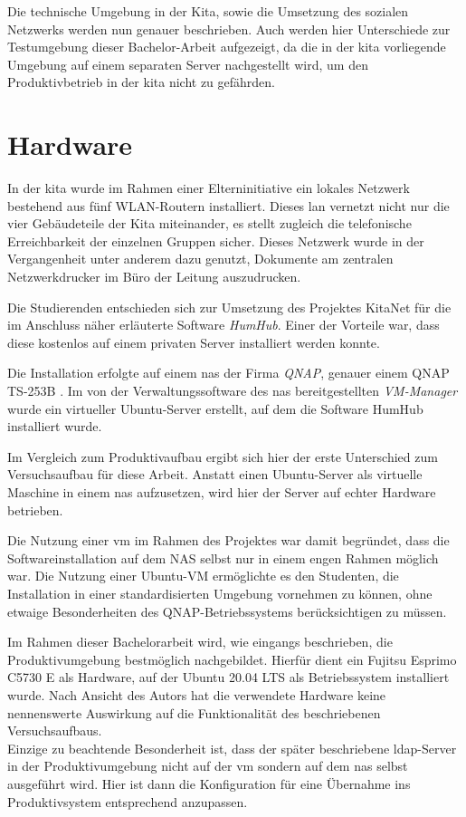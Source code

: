 Die technische Umgebung in der Kita, sowie die Umsetzung des sozialen Netzwerks werden nun genauer beschrieben. Auch werden hier Unterschiede zur Testumgebung dieser Bachelor-Arbeit aufgezeigt, da die in der \ac{kita} vorliegende Umgebung auf einem separaten Server nachgestellt wird, um den Produktivbetrieb in der \ac{kita} nicht zu gefährden.

\section{Hardware}

In der \ac{kita} wurde im Rahmen einer Elterninitiative ein lokales Netzwerk bestehend aus fünf WLAN-Routern installiert. Dieses \ac{lan} vernetzt nicht nur die vier Gebäudeteile der Kita miteinander, es stellt zugleich die telefonische Erreichbarkeit der einzelnen Gruppen sicher. Dieses Netzwerk wurde in der Vergangenheit unter anderem dazu genutzt, Dokumente am zentralen Netzwerkdrucker im Büro der Leitung auszudrucken.

Die Studierenden entschieden sich zur Umsetzung des Projektes KitaNet für die im Anschluss näher erläuterte Software \textit{HumHub}.
Einer der Vorteile war, dass diese kostenlos auf einem privaten Server installiert werden konnte. 

Die Installation erfolgte auf einem \ac{nas} der Firma \textit{QNAP}, genauer einem QNAP TS-253B \citep[vgl.][]{qnap}. 
Im von der Verwaltungssoftware des \ac{nas} bereitgestellten \textit{VM-Manager} wurde ein virtueller Ubuntu-Server erstellt, auf dem die Software HumHub installiert wurde.

Im Vergleich zum Produktivaufbau ergibt sich hier der erste Unterschied zum Versuchsaufbau für diese Arbeit.
Anstatt einen Ubuntu-Server als virtuelle Maschine in einem \ac{nas} aufzusetzen, wird hier der Server auf echter Hardware betrieben. 

Die Nutzung einer \ac{vm} im Rahmen des Projektes war damit begründet, dass die Softwareinstallation auf dem NAS selbst nur in einem engen Rahmen möglich war. Die Nutzung einer Ubuntu-VM ermöglichte es den Studenten, die Installation in einer standardisierten Umgebung vornehmen zu können, ohne etwaige Besonderheiten des QNAP-Betriebssystems berücksichtigen zu müssen.

Im Rahmen dieser Bachelorarbeit wird, wie eingangs beschrieben, die Produktivumgebung bestmöglich nachgebildet. 
Hierfür dient ein Fujitsu Esprimo C5730 E als Hardware, auf der Ubuntu 20.04 LTS als Betriebssystem installiert wurde. 
Nach Ansicht des Autors hat die verwendete Hardware keine nennenswerte Auswirkung auf die Funktionalität des beschriebenen Versuchsaufbaus. \\ 
Einzige zu beachtende Besonderheit ist, dass der später beschriebene \ac{ldap}-Server in der Produktivumgebung nicht auf der \ac{vm} sondern auf dem \ac{nas} selbst ausgeführt wird. Hier ist dann die Konfiguration für eine Übernahme ins Produktivsystem entsprechend anzupassen.

